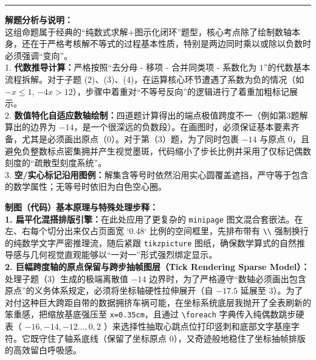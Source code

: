 \vspace{0.6cm}
\hrule
\vspace{0.4cm}

{\small\color{gray}
\textbf{解题分析与说明：}\\
这组命题属于经典的“纯数式求解+图示化闭环”题型，核心考点除了绘制数轴本身，还在于严格考核解不等式的过程基本性质，特别是两边同时乘以或除以负数时必须强调“变向”。\\
1. \textbf{代数推导计算：}严格按照“去分母 - 移项 - 合并同类项 - 系数化为 $1$”的代数基本流程拆解。对于子题 (2)、(3)、(4)，在运算核心环节遭遇了系数为负的情况（如 $-x \leqslant 1$, $-4x > 12$），步骤中着重对“不等号反向”的逻辑进行了着重加粗标记展示。\\
2. \textbf{数值特化自适应数轴绘制：}四道题计算得出的端点极值跨度不一（例如第3题解算出的边界为 $-14$，是一个很深远的负数段）。在画图时，必须保证基本要素齐备，尤其是必须画出原点（$0$）。对于第（3）题，为了同时包裹 $-14$ 与原点 $0$，且避免负整数标点密集拥并产生视觉墨斑，代码缩小了步长比例并采用了仅标记偶数刻度的“疏散型刻度系统”。\\
3. \textbf{空/实心标记沿用图例：}解集含等号时依然沿用实心圆覆盖遮挡，严守等于包含的数学属性；无等号时依旧为白色空心圈。
}

\vspace{0.6cm}

{\small\color{blue!70!black}
\textbf{制图（代码）基本原理与特殊处理步释：}\\
\textbf{1. 扁平化混搭排版引擎：}在此处应用了更复杂的 \texttt{minipage} 图文混合套嵌法。在左、右每个切分出来仅占页面宽 `0.48` 比例的空间框里，先排布带有 \texttt{\textbackslash\textbackslash} 强制换行的纯数学文字严密推理流，随后紧跟 \texttt{tikzpicture} 图纸，确保数学算式的自然推导感与几何视觉直观能够以“一对一”形式强烈绑定显示。\\
\textbf{2. 巨幅跨度轴的原点保留与跨步抽帧图层（Tick Rendering Sparse Model）：}处理子题（3）生成的极端离散值 $-14$ 边界时，为了严格遵守“数轴必须画出包含原点”的义务体系规定，必须将坐标轴硬性拉伸展开（自 $-17.5$ 延展至 $3$）。为了对付这种巨大跨距自带的数据拥挤车祸可能，在坐标系统底层我抛开了全表刷新的笨重感，把缩放基底强压至 \texttt{x=0.35cm}，且通过 \texttt{\textbackslash foreach} 字典传入纯偶数跳步硬表（ $-16,-14,-12\dots,0,2$ ）来选择性抽取心跳点位打印竖刺和底部文字基座字符。它既守住了轴系底线（保留了坐标原点 $0$），又奇迹般地稳住了坐标抽帧排版的高效留白呼吸感。
}

\newpage



